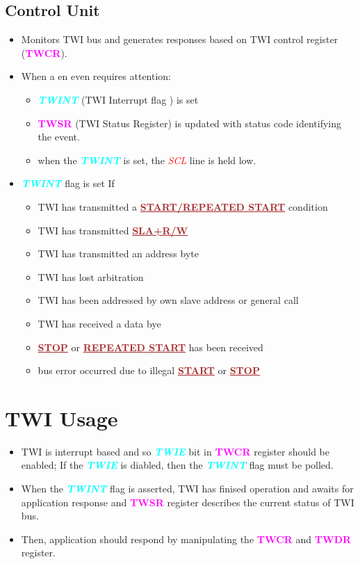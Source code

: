 \documentclass{article}
\newcommand{\bitFormat}[1]{\emph{\textbf{\textcolor{cyan}{#1}}}}
\newcommand{\regFormat}[1]{\textbf{\textcolor{magenta}{#1}}}
\newcommand{\pinFormat}[1]{\emph{\textcolor{red}{#1}}}
\newcommand{\iicFormat}[1]{\textbf{\textcolor{brown}{\underline{#1}}}}
\begin{document}
\subsection{Control Unit}
\begin{itemize}
    \item Monitors TWI bus and generates responses based on TWI control register (\regFormat{TWCR}).
    \item When a en even requires attention:
    \begin{itemize}
        \item \bitFormat{TWINT} (TWI Interrupt flag ) is set 
        \item \regFormat{TWSR} (TWI Status Register) is updated with status code identifying the event.
        \item when the \bitFormat{TWINT} is set, the \pinFormat{SCL} line is held low.
    \end{itemize}
    \item \bitFormat{TWINT} flag is set If
    \begin{itemize}
        \item TWI has transmitted a \iicFormat{START/REPEATED START} condition
        \item TWI has transmitted \iicFormat{SLA+R/W}
        \item TWI has transmitted an address byte
        \item TWI has lost arbitration
        \item TWI has been addressed by own slave address or general call
        \item TWI has received a data bye
        \item \iicFormat{STOP} or \iicFormat{REPEATED START} has been received
        \item bus error occurred due to illegal \iicFormat{START} or \iicFormat{STOP}
    \end{itemize}
\end{itemize}

\section{TWI Usage}
\begin{itemize}
    \item TWI is interrupt based and so \bitFormat{TWIE} bit in \regFormat{TWCR} register should be enabled; If the \bitFormat{TWIE} is diabled, then the \bitFormat{TWINT} flag must be polled.
    \item When the \bitFormat{TWINT} flag is asserted, TWI has finised operation and awaits for application response and \regFormat{TWSR} register describes the current status of TWI bus.
    \item Then, application should respond by manipulating the \regFormat{TWCR} and \regFormat{TWDR} register.
\end{itemize}
\end{document}
